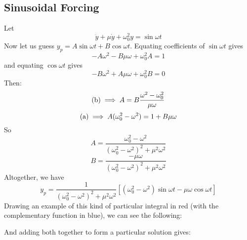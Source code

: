\subsection{Sinusoidal Forcing}
Let
\[
	\ddot y + \mu \dot y + \omega_0^2 y = \sin \omega t
\]
Now let us guess \(y_p = A\sin \omega t + B\cos \omega t\).
Equating coefficients of \(\sin\omega t\) gives
\[
	-A\omega^2 - B\mu\omega + \omega_0^2A = 1 \tag{a}
\]
and equating \(\cos\omega t\) gives
\[
	-B\omega^2 + A\mu\omega + \omega_0^2B = 0 \tag{b}
\]
Then:
\[
	(\text b) \implies A = B \frac{\omega^2 - \omega_0^2}{\mu\omega}
\]
\[
	(\text a) \implies A(\omega_0^2 - \omega^2) = 1 + B\mu\omega
\]
So
\[
	A = \frac{\omega_0^2 - \omega^2}{(\omega_0^2 - \omega^2)^2 + \mu^2\omega^2}
\]
\[
	B = \frac{-\mu\omega}{(\omega_0^2 - \omega^2)^2 + \mu^2\omega^2}
\]
Altogether, we have
\[
	y_p = \frac{1}{(\omega_0^2 - \omega^2)^2 + \mu^2\omega^2}\left[ (\omega_0^2 - \omega^2)\sin\omega t - \mu \omega \cos \omega t \right]
\]
Drawing an example of this kind of particular integral in red (with the complementary function in blue), we can see the following:\medskip


\noindent And adding both together to form a particular solution gives:\medskip


